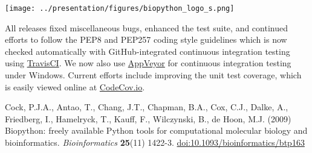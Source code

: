\documentclass[10pt,oneside]{article}
\begin{document}
\begin{center}
\texttt{[image: ../presentation/figures/biopython\_logo\_s.png]}
\end{center}

All releases fixed miscellaneous bugs, enhanced the test suite,
and continued efforts to follow the PEP8 and PEP257 coding style guidelines
which is now checked automatically with GitHub-integrated continuous integration
testing using \href{https://travis-ci.org/biopython/biopython/builds}{TravisCI}.
We now also use \href{https://ci.appveyor.com/project/biopython/biopython/history}{AppVeyor}
for continuous integration testing under Windows.
Current efforts include improving the unit test coverage, which is easily viewed
online at \href{https://codecov.io/github/biopython/biopython/}{CodeCov.io}.

\begin{thebibliography}{}

Cock, P.J.A., Antao, T., Chang, J.T., Chapman, B.A., Cox, C.J., Dalke, A., Friedberg, I., Hamelryck, T., Kauff, F., Wilczynski, B., de Hoon, M.J. (2009) Biopython: freely available Python tools for computational molecular biology and bioinformatics. {\it Bioinformatics} {\bf 25}(11) 1422-3. \href{http://dx.doi.org/10.1093/bioinformatics/btp163}{doi:10.1093/bioinformatics/btp163}

\end{thebibliography}
\end{document}
